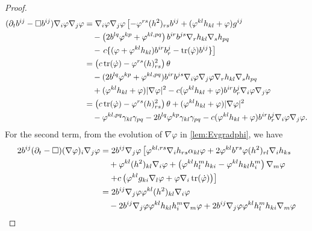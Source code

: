 \documentclass{amsart}
\begin{document}
\begin{proof}
\begin{equation}
\begin{split}
(\partial_{t}b^{ij} - \Box b^{ij})\nabla_i \varphi\nabla_j\varphi &= \nabla_i \varphi \nabla_j \varphi\left[-\varphi^{rs} (h^2)_{rs} b^{ij} + (\varphi^{kl}h_{kl} + \varphi) g^{ij} \right. \\
& \quad - \left(2b^{lq}\varphi^{kp} + \varphi^{kl,pq}\right) b^{ir}b^{js} \nabla_r h_{kl} \nabla_s h_{pq} \\
& \quad - \left. c \{(\varphi + \varphi^{kl}h_{kl}) b^{ir}b^{j}_{r} - \operatorname{tr}(\dot{\varphi}) b^{ij}\}\right] \\
&= \left(c\operatorname{tr}(\dot{\varphi}) - \varphi^{rs}(h)^2_{rs}\right) \theta\\ & \quad - (2b^{lq}\varphi^{kp} + \varphi^{kl,pq}) b^{ir}b^{js}\nabla_i\varphi\nabla_j\varphi\nabla_rh_{kl}\nabla_s h_{pq} \\
&\quad + (\varphi^{kl}h_{kl} + \varphi)|\nabla\varphi|^{2} - c(\varphi^{kl}h_{kl} + \varphi)b^{ir}b^{j}_{r}\nabla_i \varphi\nabla_j\varphi \\
&= \left(c\operatorname{tr}(\dot{\varphi}) - \varphi^{rs}(h)^2_{rs}\right) \theta  + (\varphi^{kl}h_{kl} + \varphi)|\nabla\varphi|^{2} \\
&\quad - \varphi^{kl,pq} \gamma_{kl} \gamma_{pq} - 2b^{lq}\varphi^{kp} \gamma_{kl} \gamma_{pq}  - c(\varphi^{kl}h_{kl} + \varphi)b^{ir}b^{j}_{r}\nabla_i \varphi\nabla_j\varphi.
\end{split}
\end{equation}
For the second term, from the evolution of \(\nabla\varphi\) in \cref{lem:Evgradphi}, we have
\begin{equation}
\label{eq:delt_theta2}
\begin{split}
2 b^{ij} (\partial_{t} - \Box) (\nabla\varphi)_i \nabla_j\varphi &= 2 b^{ij} \nabla_j\varphi \left[\varphi^{kl,rs}\nabla_i h_{rs} \a_{kl}\varphi + 2 \varphi^{kl} b^{rs} \varphi(h^2)_{rl} \nabla_i h_{ks} \right. \\
&\quad + \varphi^{kl}(h^2)_{kl}\nabla_i \varphi + \left(\varphi^{kl}h^{m}_{l}h_{ki} - \varphi^{kl}h_{kl}h^{m}_{i}\right) \nabla_m \varphi\\
&\quad \left. + c\left(\varphi^{kl}g_{ki} \nabla_l \varphi + \varphi \nabla_i \operatorname{tr}(\dot{\p})\right)\right] \\
&= 2 b^{ij} \nabla_j\varphi \varphi^{kl}(h^2)_{kl}\nabla_i \varphi \\
&\quad - 2 b^{ij} \nabla_j\varphi \varphi^{kl}h_{kl}h^{m}_{i} \nabla_m \varphi + 2 b^{ij} \nabla_j\varphi \varphi^{kl}h^{m}_{l}h_{ki} \nabla_m \varphi \\

\end{split}
\end{equation}
\end{proof}
\end{document}

